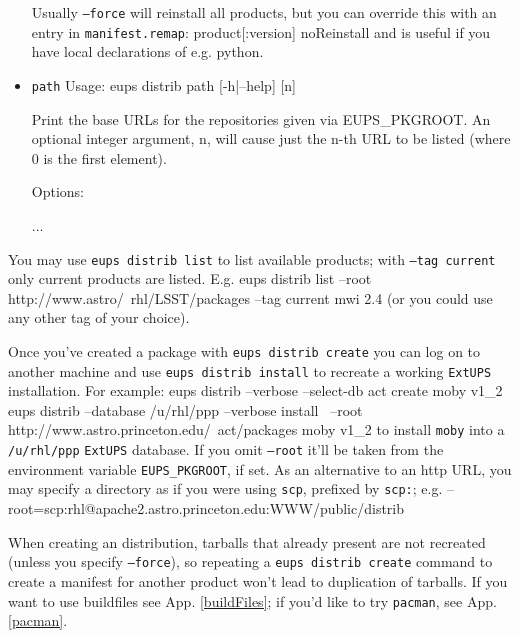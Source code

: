 \documentclass{article}
\newcommand{\code}[1]{\texttt{#1}}
\newcommand{\file}[1]{\texttt{#1}}
\newcommand{\eups}{\code{ExtUPS}\xspace}
\newcommand{\pacman}{\code{pacman}}
\let\overbatim=\verbatim
\let\oendverbatim=\endverbatim
\renewenvironment{verbatim}
{\center\minipage{16cm}\overbatim}
{\oendverbatim\endminipage\endcenter}
\begin{document}
\begin{itemize}
Usually \code{--force} will reinstall all products, but you can override this with an entry in
\file{manifest.remap}:
\begin{verbatim}
product[:version]  noReinstall
\end{verbatim}
and is useful if you have local declarations of e.g. python.

\item\code{path}
\begin{verbatim}
Usage: eups distrib path [-h|--help] [n]

Print the base URLs for the repositories given via EUPS_PKGROOT.  An
optional integer argument, n, will cause just the n-th URL to be listed
(where 0 is the first element).

Options:

  ...
\end{verbatim}


\end{itemize}

You may use \code{eups distrib list} to list available products; with \code{--tag current}
only current products are listed.  E.g.
\begin{verbatim}
eups distrib list --root http://www.astro/~rhl/LSST/packages --tag current mwi 2.4
\end{verbatim}
(or you could use any other tag of your choice).

Once you've created a package with \code{eups distrib create} you can log on to
another machine and use \code{eups distrib install} to
recreate a working \eups installation.  For example:
\begin{verbatim}
eups distrib --verbose --select-db act create moby v1_2
eups distrib --database /u/rhl/ppp --verbose install \
             --root http://www.astro.princeton.edu/~act/packages moby v1_2
\end{verbatim}
to install \code{moby} into a \file{/u/rhl/ppp} \eups database. If you omit
\code{--root} it'll be taken from the environment variable \code{EUPS\_PKGROOT},
if set.  As an alternative to an http URL, you may specify a directory as
if you were using \code{scp}, prefixed by \code{scp:}; e.g.
\begin{verbatim}
    --root=scp:rhl@apache2.astro.princeton.edu:WWW/public/distrib
\end{verbatim}

When creating an distribution, tarballs that already present are not recreated
(unless you specify \code{--force}),
so repeating a \code{eups distrib create} command to create a manifest for another
product won't lead to duplication of tarballs.  If you want to use buildfiles
see App. \ref{buildFiles}; if you'd like to try \pacman{}, see App. \ref{pacman}.
\end{document}
